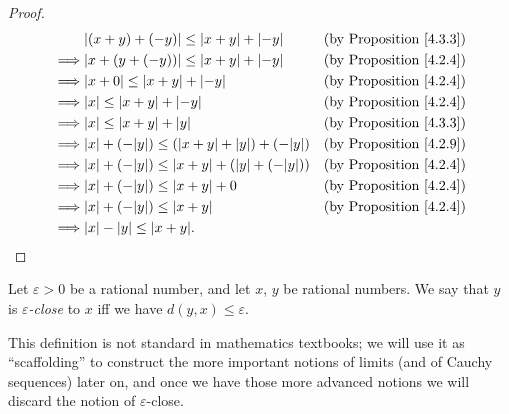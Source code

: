 \begin{proof}
    \begin{align*}
                 & \abs*{(x + y) + (-y)} \leq \abs*{x + y} + \abs*{-y}                 & \text{(by Proposition \ref{4.3.3})} \\
        \implies & \abs*{x + (y + (-y))} \leq \abs*{x + y} + \abs*{-y}                 & \text{(by Proposition \ref{4.2.4})} \\
        \implies & \abs*{x + 0} \leq \abs*{x + y} + \abs*{-y}                          & \text{(by Proposition \ref{4.2.4})} \\
        \implies & \abs*{x} \leq \abs*{x + y} + \abs*{-y}                              & \text{(by Proposition \ref{4.2.4})} \\
        \implies & \abs*{x} \leq \abs*{x + y} + \abs*{y}                               & \text{(by Proposition \ref{4.3.3})} \\
        \implies & \abs*{x} + (-\abs*{y}) \leq (\abs*{x + y} + \abs*{y}) + (-\abs*{y}) & \text{(by Proposition \ref{4.2.9})} \\
        \implies & \abs*{x} + (-\abs*{y}) \leq \abs*{x + y} + (\abs*{y} + (-\abs*{y})) & \text{(by Proposition \ref{4.2.4})} \\
        \implies & \abs*{x} + (-\abs*{y}) \leq \abs*{x + y} + 0                        & \text{(by Proposition \ref{4.2.4})} \\
        \implies & \abs*{x} + (-\abs*{y}) \leq \abs*{x + y}                            & \text{(by Proposition \ref{4.2.4})} \\
        \implies & \abs*{x} - \abs*{y} \leq \abs*{x + y}.
    \end{align*}
\end{proof}

\begin{definition}\label{4.3.4}
    Let \(\varepsilon > 0\) be a rational number, and let \(x\), \(y\) be rational numbers.
    We say that \(y\) is \emph{\(\varepsilon\)-close} to \(x\) iff we have \(d(y, x) \leq \varepsilon\).
\end{definition}

\begin{remark}\label{4.3.5}
    This definition is not standard in mathematics textbooks;
    we will use it as ``scaffolding'' to construct the more important notions of limits (and of Cauchy sequences) later on, and once we have those more advanced notions we will discard the notion of \(\varepsilon\)-close.
\end{remark}

